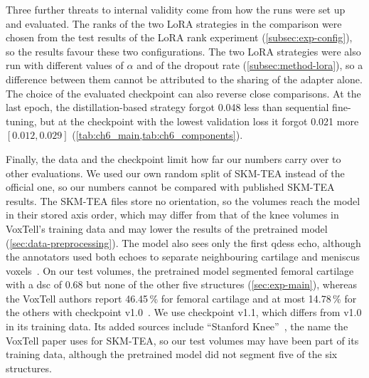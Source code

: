 Three further threats to internal validity come from how the runs were set up and evaluated.
The ranks of the two LoRA strategies in the comparison were chosen from the test results of the LoRA rank experiment (\cref{subsec:exp-config}), so the results favour these two configurations.
The two LoRA strategies were also run with different values of $\alpha$ and of the dropout rate (\cref{subsec:method-lora}), so a difference between them cannot be attributed to the sharing of the adapter alone.
The choice of the evaluated checkpoint can also reverse close comparisons.
At the last epoch, the distillation-based strategy forgot 0.048 less than sequential fine-tuning, but at the checkpoint with the lowest validation loss it forgot 0.021 more $[0.012, 0.029]$ (\cref{tab:ch6_main,tab:ch6_components}).

Finally, the data and the checkpoint limit how far our numbers carry over to other evaluations.
We used our own random split of SKM-TEA instead of the official one, so our numbers cannot be compared with published SKM-TEA results.
The SKM-TEA files store no orientation, so the volumes reach the model in their stored axis order, which may differ from that of the knee volumes in VoxTell's training data and may lower the results of the pretrained model (\cref{sec:data-preprocessing}).
The model also sees only the first \gls{qdess} echo, although the annotators used both echoes to separate neighbouring cartilage and meniscus voxels~\cite[App.~A.4]{desai2021skmtea}.
On our test volumes, the pretrained model segmented femoral cartilage with a \gls{dsc} of 0.68 but none of the other five structures (\cref{sec:exp-main}), whereas the VoxTell authors report 46.45\,\% for femoral cartilage and at most 14.78\,\% for the others with checkpoint v1.0~\cites[Suppl.~Table~9]{rokuss2025voxtellfreetextpromptableuniversal}{rokuss2026voxtellmodelcard}.
We use checkpoint v1.1, which differs from v1.0 in its training data.
Its added sources include ``Stanford Knee''~\cite{rokuss2026voxtellissue15}, the name the VoxTell paper uses for SKM-TEA, so our test volumes may have been part of its training data, although the pretrained model did not segment five of the six structures.

